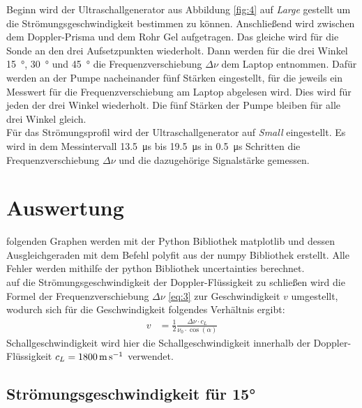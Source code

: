     \justifying Beginn wird der Ultraschallgenerator aus Abbildung \ref{fig:4} auf \textit{Large} gestellt um die Strömungsgeschwindigkeit bestimmen zu können. Anschließend wird zwischen
    dem Doppler-Prisma und dem Rohr Gel aufgetragen. Das gleiche wird für die Sonde an den drei Aufsetzpunkten wiederholt. Dann werden für die drei Winkel \SI{15}{\degree}, 
    \SI{30}{\degree} und \SI{45}{\degree} die Frequenzverschiebung $\Delta\nu$ dem Laptop entnommen. Dafür werden an der Pumpe nacheinander fünf Stärken eingestellt, für die jeweils ein Messwert 
    für die Frequenzverschiebung am Laptop abgelesen wird. Dies wird für jeden der drei Winkel wiederholt. Die fünf Stärken der Pumpe bleiben für alle drei Winkel gleich.\\
    Für das Strömungsprofil wird der Ultraschallgenerator auf \textit{Small} eingestellt. Es wird in dem Messintervall \SI{13.5}{\micro\second} bis \SI{19.5}{\micro\second} in \SI{0.5}{\micro\second} Schritten die 
    Frequenzverschiebung $\Delta\nu$ und die dazugehörige Signalstärke gemessen. 

\newpage
\section{Auswertung}

    \justifying folgenden Graphen werden mit der Python Bibliothek matplotlib \cite{matplotlib} und dessen Ausgleichgeraden mit dem Befehl polyfit aus der numpy Bibliothek 
    \cite{numpy} erstellt. Alle Fehler werden mithilfe der python Bibliothek uncertainties \cite{uncertainties} berechnet.\\
    \justifying auf die Strömungsgeschwindigkeit der Doppler-Flüssigkeit zu schließen wird die Formel der Frequenzverschiebung $\Delta\nu$ \eqref{eq:3} zur Geschwindigkeit
    $v$ umgestellt, wodurch sich für die Geschwindigkeit folgendes Verhältnis ergibt:
    \begin{align}
        v &= \frac{1}{2} \frac{\Delta\nu \cdot c_L}{\nu_0\cdot \cos(\alpha)} \label{eq:5}
    \end{align}
    \justifying Schallgeschwindigkeit wird hier die Schallgeschwindigkeit innerhalb der Doppler-Flüssigkeit
    $c_L=\text{\SI{1800}{\meter\per\second}}$ \cite{V903} verwendet. 

\newpage   
\subsection{Strömungsgeschwindigkeit für 15°}\label{sec:1}

